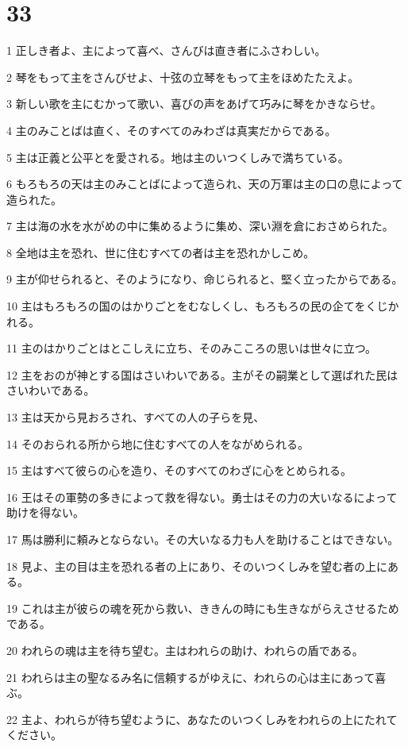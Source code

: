 \chapter{33}

\par 1 正しき者よ、主によって喜べ、さんびは直き者にふさわしい。
\par 2 琴をもって主をさんびせよ、十弦の立琴をもって主をほめたたえよ。
\par 3 新しい歌を主にむかって歌い、喜びの声をあげて巧みに琴をかきならせ。
\par 4 主のみことばは直く、そのすべてのみわざは真実だからである。
\par 5 主は正義と公平とを愛される。地は主のいつくしみで満ちている。
\par 6 もろもろの天は主のみことばによって造られ、天の万軍は主の口の息によって造られた。
\par 7 主は海の水を水がめの中に集めるように集め、深い淵を倉におさめられた。
\par 8 全地は主を恐れ、世に住むすべての者は主を恐れかしこめ。
\par 9 主が仰せられると、そのようになり、命じられると、堅く立ったからである。
\par 10 主はもろもろの国のはかりごとをむなしくし、もろもろの民の企てをくじかれる。
\par 11 主のはかりごとはとこしえに立ち、そのみこころの思いは世々に立つ。
\par 12 主をおのが神とする国はさいわいである。主がその嗣業として選ばれた民はさいわいである。
\par 13 主は天から見おろされ、すべての人の子らを見、
\par 14 そのおられる所から地に住むすべての人をながめられる。
\par 15 主はすべて彼らの心を造り、そのすべてのわざに心をとめられる。
\par 16 王はその軍勢の多きによって救を得ない。勇士はその力の大いなるによって助けを得ない。
\par 17 馬は勝利に頼みとならない。その大いなる力も人を助けることはできない。
\par 18 見よ、主の目は主を恐れる者の上にあり、そのいつくしみを望む者の上にある。
\par 19 これは主が彼らの魂を死から救い、ききんの時にも生きながらえさせるためである。
\par 20 われらの魂は主を待ち望む。主はわれらの助け、われらの盾である。
\par 21 われらは主の聖なるみ名に信頼するがゆえに、われらの心は主にあって喜ぶ。
\par 22 主よ、われらが待ち望むように、あなたのいつくしみをわれらの上にたれてください。

